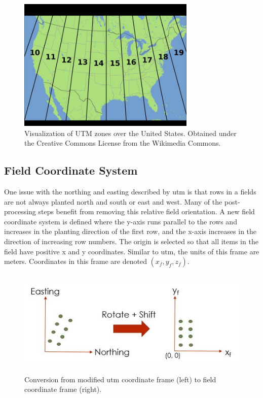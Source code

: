 \begin{figure}
	\centering
    \includegraphics[height=2.5in]{figures/utm_zones.jpg}
    \caption[UTM zones]{Visualization of UTM zones over the United States. Obtained under the Creative Commons License from the Wikimedia Commons.}
    \label{utm_zones}
\end{figure}

\subsection{Field Coordinate System}
\label{section:field_coordinates}

One issue with the northing and easting described by \ac{utm} is that rows in a fields are not always planted north and south or east and west.  Many of the post-processing steps benefit from removing this relative field orientation. A new field coordinate system is defined where the y-axis runs parallel to the rows and increases in the planting direction of the first row, and the x-axis increases in the direction of increasing row numbers.  The origin is selected so that all items in the field have positive x and y coordinates.   Similar to \ac{utm}, the units of this frame are meters.  Coordinates in this frame are denoted $(x_f,y_f,z_f)$.

\begin{figure}
	\centering
    \includegraphics[height=2in]{figures/field_coordinates_small.jpg}
    \caption[Field coordinates]{Conversion from modified \ac{utm} coordinate frame (left) to field coordinate frame (right).}
    \label{field_coordinates}
\end{figure}

